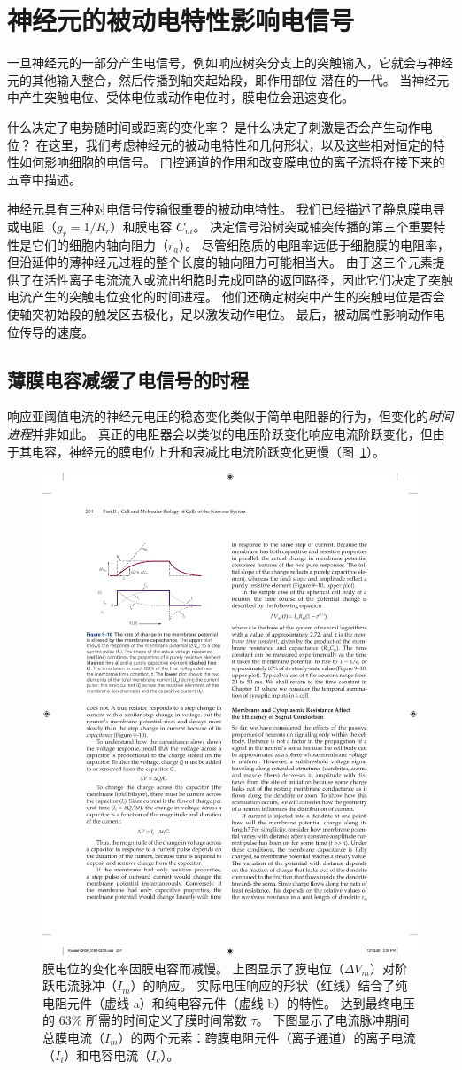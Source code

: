 \section{神经元的被动电特性影响电信号}

一旦神经元的一部分产生电信号，例如响应树突分支上的突触输入，它就会与神经元的其他输入整合，然后传播到轴突起始段，即作用部位 潜在的一代。
当神经元中产生突触电位、受体电位或动作电位时，膜电位会迅速变化。


什么决定了电势随时间或距离的变化率？
是什么决定了刺激是否会产生动作电位？
在这里，我们考虑神经元的被动电特性和几何形状，以及这些相对恒定的特性如何影响细胞的电信号。 
门控通道的作用和改变膜电位的离子流将在接下来的五章中描述。


神经元具有三种对电信号传输很重要的被动电特性。 
我们已经描述了静息膜电导或电阻（$g_r = 1 / R_r$）和膜电容 $C_m$。
决定信号沿树突或轴突传播的第三个重要特性是它们的细胞内轴向阻力（$r_a$）。 
尽管细胞质的电阻率远低于细胞膜的电阻率，但沿延伸的薄神经元过程的整个长度的轴向阻力可能相当大。
由于这三个元素提供了在活性离子电流流入或流出细胞时完成回路的返回路径，因此它们决定了突触电流产生的突触电位变化的时间进程。
他们还确定树突中产生的突触电位是否会使轴突初始段的触发区去极化，足以激发动作电位。
最后，被动属性影响动作电位传导的速度。


\subsection{薄膜电容减缓了电信号的时程}

响应亚阈值电流的神经元电压的稳态变化类似于简单电阻器的行为，但变化的\textit{时间进程}并非如此。 
真正的电阻器会以类似的电压阶跃变化响应电流阶跃变化，但由于其电容，神经元的膜电位上升和衰减比电流阶跃变化更慢（图~\ref{fig:9_10}）。


\begin{figure}[htbp]
	\centering
	\includegraphics[width=0.5\linewidth]{chap09/fig_9_10}
	\caption{膜电位的变化率因膜电容而减慢。
		上图显示了膜电位（$\Delta V_m$）对阶跃电流脉冲（$I_m$）的响应。
		实际电压响应的形状（红线）结合了纯电阻元件（虚线 a）和纯电容元件（虚线 b）的特性。
		达到最终电压的 63\% 所需的时间定义了膜时间常数 $\tau$。
		下图显示了电流脉冲期间总膜电流（$I_m$）的两个元素：跨膜电阻元件（离子通道）的离子电流（$I_i$）和电容电流（$I_c$）。}
	\label{fig:9_10}
\end{figure}


